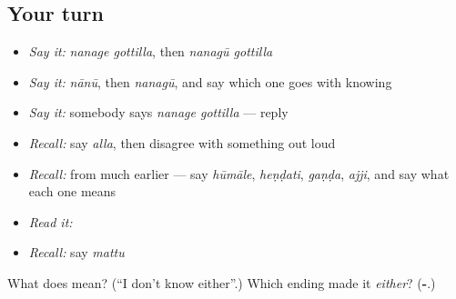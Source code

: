 \subsection*{Your turn}
\begin{itemize}
\raggedright
  \item \emph{Say it:} \emph{nanage gottilla}, then \emph{nanagū gottilla}
  \item \emph{Say it:} \emph{nānū}, then \emph{nanagū}, and say which one goes with knowing
  \item \emph{Say it:} somebody says \emph{nanage gottilla} — reply
  \item \emph{Recall:} say \emph{alla}, then disagree with something out loud
  \item \emph{Recall:} from much earlier — say \emph{hūmāle}, \emph{heṇḍati}, \emph{gaṇḍa}, \emph{ajji}, and say what each one means
  \item \emph{Read it:} \textbf{}
  \item \emph{Recall:} say \emph{mattu}
\end{itemize}

\begin{tcolorbox}[breakable,colback=teal!4,colframe=teal!35!black,title={Before you move on}]
What does   mean? (\textquotedblleft{}I don't know either\textquotedblright{}.) Which ending made it \emph{either}? (\textbf{-}.)
\end{tcolorbox}
